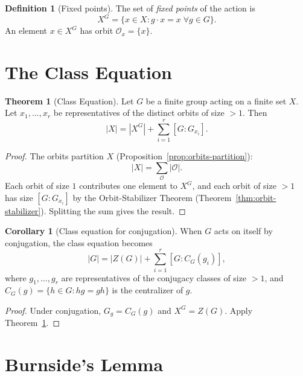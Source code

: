 \documentclass[12pt,a4paper,openany]{book}
\theoremstyle{definition}
\newtheorem{definition}{Definition}[chapter]
\newtheorem{theorem}{Theorem}[chapter]
\newtheorem{corollary}{Corollary}[chapter]
\theoremstyle{remark}
\begin{document}
\begin{definition}[Fixed points]\label{def:fixed-points}
The set of \emph{fixed points} of the action is
\[
   X^G = \{x\in X : g\cdot x = x\;\forall g\in G\}.
\]
An element $x\in X^G$ has orbit $\mathcal{O}_x=\{x\}$.
\end{definition}

\section{The Class Equation}\label{sec:class-equation}

\begin{theorem}[Class Equation]\label{thm:class-equation}
Let $G$ be a finite group acting on a finite set $X$.  Let
$x_1,\dots,x_r$ be representatives of the distinct orbits of
size $>1$.  Then
\[
   |X| = |X^G| + \sum_{i=1}^{r} [G:G_{x_i}].
\]
\end{theorem}

\begin{proof}
The orbits partition $X$ (Proposition~\ref{prop:orbits-partition}):
\[
   |X| = \sum_{\mathcal{O}} |\mathcal{O}|.
\]
Each orbit of size $1$ contributes one element to $X^G$, and each
orbit of size $>1$ has size $[G:G_{x_i}]$ by the Orbit-Stabilizer
Theorem (Theorem~\ref{thm:orbit-stabilizer}).  Splitting the sum
gives the result.
\end{proof}

\begin{corollary}[Class equation for conjugation]\label{cor:class-equation-conj}
When $G$ acts on itself by conjugation, the class equation becomes
\[
   |G| = |Z(G)| + \sum_{i=1}^{r} [G:C_G(g_i)],
\]
where $g_1,\dots,g_r$ are representatives of the conjugacy classes
of size $>1$, and $C_G(g)=\{h\in G : hg=gh\}$ is the centralizer
of $g$.
\end{corollary}

\begin{proof}
Under conjugation, $G_g = C_G(g)$ and $X^G=Z(G)$.  Apply
Theorem~\ref{thm:class-equation}.
\end{proof}

\section{Burnside's Lemma}\label{sec:burnside}
\end{document}
